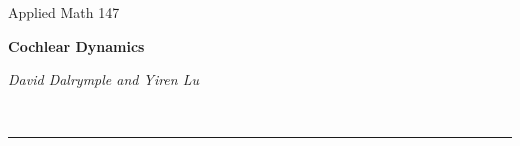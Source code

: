 \documentclass[letter,11pt]{article}
\begin{document}
\begin{center}
\parbox[b]{3cm}{\hfill Applied Math 147 \hfill} \hspace{1cm} \textbf{Cochlear Dynamics} \hspace{1cm} \parbox[b]{5cm}{\hfill \textit{David Dalrymple and Yiren Lu} \hfill} \\[-3mm]
\rule{\textwidth}{0.4pt}
\end{center}
\end{document}
